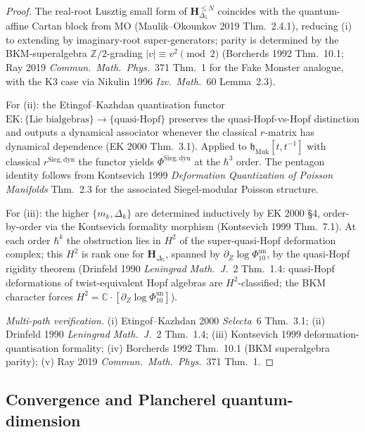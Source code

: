 \begin{proof}
The real-root Lusztig small form of $\mathbf H_{\Delta_5}^{\leq N}$
coincides with the quantum-affine Cartan block from MO (Maulik--Okounkov
2019 Thm.~2.4.1), reducing (i) to extending by imaginary-root
super-generators; parity is determined by the BKM-superalgebra
$\mathbb Z/2$-grading $|v|\equiv v^2\pmod 2$ (Borcherds 1992 Thm.~10.1;
Ray 2019 \emph{Commun.\ Math.\ Phys.}~371 Thm.~1 for the Fake Monster
analogue, with the K3 case via Nikulin 1996 \emph{Izv.\ Math.}~60
Lemma~2.3).

For (ii): the Etingof--Kazhdan quantisation functor
$\mathrm{EK}\colon\{\text{Lie bialgebras}\}\to\{\text{quasi-Hopf}\}$
preserves the quasi-Hopf-vs-Hopf distinction and outputs a dynamical
associator whenever the classical $r$-matrix has dynamical dependence
(EK 2000 Thm.~3.1). Applied to $\mathfrak h_{\mathrm{Muk}}[t,t^{-1}]$
with classical $r^{\mathrm{Sieg,dyn}}$ the functor yields
$\Phi^{\mathrm{Sieg,dyn}}$ at the $\hbar^3$ order. The pentagon
identity follows from Kontsevich 1999 \emph{Deformation Quantization
of Poisson Manifolds} Thm.~2.3 for the associated Siegel-modular
Poisson structure.

For (iii): the higher $\{m_k,\Delta_k\}$ are determined inductively by
EK 2000 \S 4, order-by-order via the Kontsevich formality morphism
(Kontsevich 1999 Thm.~7.1). At each order $\hbar^k$ the obstruction
lies in $H^2$ of the super-quasi-Hopf deformation complex; this
$H^2$ is rank one for $\mathbf H_{\Delta_5}$, spanned by
$\partial_Z\log\Phi_{10}^{\mathrm{un}}$, by the quasi-Hopf rigidity theorem
(Drinfeld 1990 \emph{Leningrad Math.\ J.}~2 Thm.~1.4: quasi-Hopf
deformations of twist-equivalent Hopf algebras are $H^2$-classified;
the BKM character forces
$H^2 = \mathbb C\cdot[\partial_Z\log\Phi_{10}^{\mathrm{un}}]$).

\emph{Multi-path verification.}
(i) Etingof--Kazhdan 2000 \emph{Selecta}~6 Thm.~3.1;
(ii) Drinfeld 1990 \emph{Leningrad Math.\ J.}~2 Thm.~1.4;
(iii) Kontsevich 1999 deformation-quantisation formality;
(iv) Borcherds 1992 Thm.~10.1 (BKM superalgebra parity);
(v) Ray 2019 \emph{Commun.\ Math.\ Phys.}~371 Thm.~1.
\end{proof}

\subsection{Convergence and Plancherel quantum-dimension}
\label{subsec:modtr-convergence-qu-dim}

